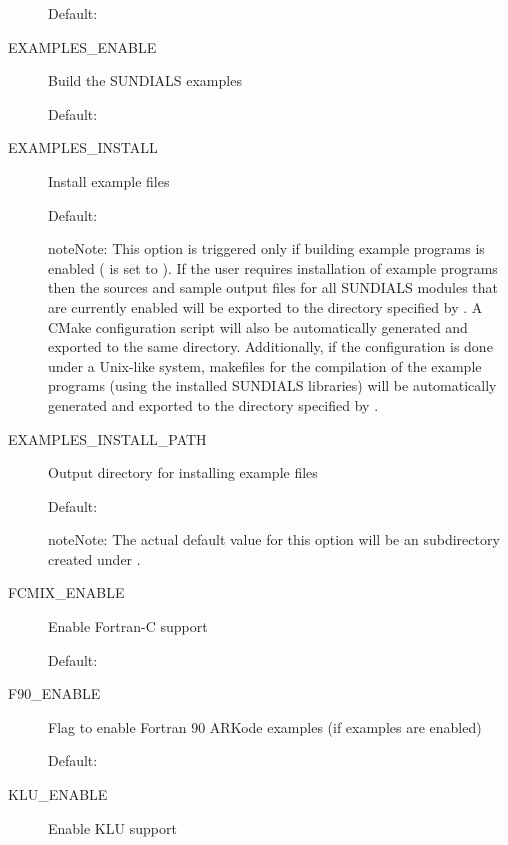 \documentclass[letterpaper,10pt,english]{sphinxmanual}
\begin{document}
\begin{description}
Default: 

\item[{\index{EXAMPLES\_ENABLE (CMake option)}EXAMPLES\_ENABLE}] \leavevmode
Build the SUNDIALS examples

Default: 

\item[{\index{EXAMPLES\_INSTALL (CMake option)}EXAMPLES\_INSTALL}] \leavevmode
Install example files

Default: 

\begin{notice}{note}{Note:}
This option is triggered only if building example programs is
enabled ( is set to ). If the user
requires installation of example programs then the sources and
sample output files for all SUNDIALS modules that are currently
enabled will be exported to the directory specified by
. A CMake configuration script will also
be automatically generated and exported to the same
directory. Additionally, if the configuration is done under a
Unix-like system, makefiles for the compilation of the
example programs (using the installed SUNDIALS libraries)
will be automatically generated and exported to the
directory specified by .
\end{notice}

\item[{\index{EXAMPLES\_INSTALL\_PATH (CMake option)}EXAMPLES\_INSTALL\_PATH}] \leavevmode
Output directory for installing example
files

Default: 

\begin{notice}{note}{Note:}
The actual default value for this option will be an
 subdirectory created under .
\end{notice}

\item[{\index{FCMIX\_ENABLE (CMake option)}FCMIX\_ENABLE}] \leavevmode
Enable Fortran-C support

Default: 

\item[{\index{F90\_ENABLE (CMake option)}F90\_ENABLE}] \leavevmode
Flag to enable Fortran 90 ARKode examples (if examples are enabled)

Default: 

\item[{\index{F90\_ENABLE (CMake option)}KLU\_ENABLE}] \leavevmode
Enable KLU support


\end{description}
\end{document}
